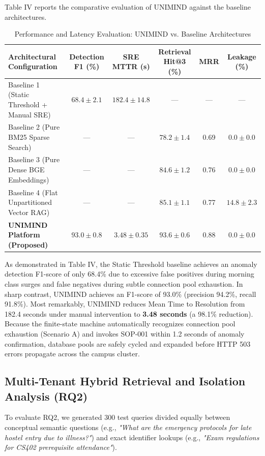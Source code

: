 \documentclass[12pt,onecolumn,draftclsnofoot]{IEEEtran}
\begin{document}
Table IV reports the comparative evaluation of UNIMIND against the baseline architectures.

\begin{table}[ht]
\caption{Performance and Latency Evaluation: UNIMIND vs. Baseline Architectures}
\centering
\small
\begin{tabular}{lccccc}
\toprule
\textbf{Architectural Configuration} & \textbf{Detection F1 (\%)} & \textbf{SRE MTTR (s)} & \textbf{Retrieval Hit@3 (\%)} & \textbf{MRR} & \textbf{Leakage (\%)} \\
\midrule
Baseline 1 (Static Threshold + Manual SRE) & $68.4 \pm 2.1$ & $182.4 \pm 14.8$ & --- & --- & --- \\
Baseline 2 (Pure BM25 Sparse Search) & --- & --- & $78.2 \pm 1.4$ & 0.69 & $0.0 \pm 0.0$ \\
Baseline 3 (Pure Dense BGE Embeddings) & --- & --- & $84.6 \pm 1.2$ & 0.76 & $0.0 \pm 0.0$ \\
Baseline 4 (Flat Unpartitioned Vector RAG) & --- & --- & $85.1 \pm 1.1$ & 0.77 & $14.8 \pm 2.3$ \\
\textbf{UNIMIND Platform (Proposed)} & $\mathbf{93.0 \pm 0.8}$ & $\mathbf{3.48 \pm 0.35}$ & $\mathbf{93.6 \pm 0.6}$ & $\mathbf{0.88}$ & $\mathbf{0.0 \pm 0.0}$ \\
\bottomrule
\end{tabular}
\end{table}

As demonstrated in Table IV, the Static Threshold baseline achieves an anomaly detection F1-score of only 68.4\% due to excessive false positives during morning class surges and false negatives during subtle connection pool exhaustion. In sharp contrast, UNIMIND achieves an F1-score of 93.0\% (precision 94.2\%, recall 91.8\%). Most remarkably, UNIMIND reduces Mean Time to Resolution from 182.4 seconds under manual intervention to \textbf{3.48 seconds} (a 98.1\% reduction). Because the finite-state machine automatically recognizes connection pool exhaustion (Scenario A) and invokes SOP-001 within 1.2 seconds of anomaly confirmation, database pools are safely cycled and expanded before HTTP 503 errors propagate across the campus cluster.

\subsection{Multi-Tenant Hybrid Retrieval and Isolation Analysis (RQ2)}
To evaluate RQ2, we generated 300 test queries divided equally between conceptual semantic questions (e.g., \emph{"What are the emergency protocols for late hostel entry due to illness?"}) and exact identifier lookups (e.g., \emph{"Exam regulations for CS402 prerequisite attendance"}).
\end{document}
